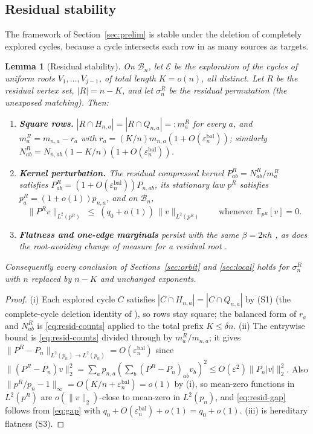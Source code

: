 \documentclass[11pt]{article}
\newcommand{\E}{\mathbb{E}}
\newcommand{\1}{\mathbf{1}}
\newcommand{\eps}{\varepsilon}
\newcommand{\cB}{\mathcal{B}}
\newcommand{\cE}{\mathcal{E}}
\newtheorem{lemma}[theorem]{Lemma}
\theoremstyle{remark}
\begin{document}
\subsection{Residual stability}
The framework of Section~\ref{sec:prelim} is stable under the deletion of
completely explored cycles, because a cycle intersects each row in as many
sources as targets.

\begin{lemma}[Residual stability]\label{lem:residual}
On $\cB_n$, let $\cE$ be the exploration of the cycles of uniform roots
$V_1,\dots,V_{j-1}$, of total length $K=o(n)$, all distinct. Let $R$ be the
residual vertex set, $|R|=n-K$, and let $\sigma_n^R$ be the residual
permutation (the unexposed matching). Then:
\begin{enumerate}[label=(\roman*)]
\item \textbf{Square rows.} $|R\cap H_{n,a}|=|R\cap Q_{n,a}|=:m_a^R$ for
every $a$, and $m_a^R=m_{n,a}-r_a$ with
$r_a=(K/n)m_{n,a}(1+O(\eps_n^{\mathrm{bal}}))$; similarly
$N_{ab}^R=N_{n,ab}(1-K/n)(1+O(\eps_n^{\mathrm{bal}}))$.
\item \textbf{Kernel perturbation.} The residual compressed kernel
$P_{ab}^R=N_{ab}^R/m_a^R$ satisfies
$P_{ab}^R=(1+O(\eps_n^{\mathrm{bal}}))P_{n,ab}$, its stationary law $p^R$
satisfies $p_a^R=(1+o(1))p_{n,a}$, and on $\cB_n$,
\begin{equation}\label{eq:resid-gap}
\|P^Rv\|_{L^2(p^R)}\;\le\;(q_0+o(1))\,\|v\|_{L^2(p^R)}
\qquad\text{whenever }\E_{p^R}[v]=0.
\end{equation}
\item \textbf{Flatness and one-edge marginals} persist with the same
$\beta=2\kappa h$ \cite[Lemmas~6.5, 6.6]{Lon26}, as does the root-avoiding
change of measure for a residual root \cite[Lemma~6.9]{Lon26}.
\end{enumerate}
Consequently every conclusion of Sections~\ref{sec:orbit} and
\ref{sec:local} holds for $\sigma_n^R$ with $n$ replaced by $n-K$ and
unchanged exponents.
\end{lemma}

\begin{proof}
(i) Each explored cycle $C$ satisfies $|C\cap H_{n,a}|=|C\cap Q_{n,a}|$ by
(S1) (the complete-cycle deletion identity of \cite[Section~6.2]{Lon26}),
so rows stay square; the balanced form of $r_a$ and $N_{ab}^R$ is
\eqref{eq:resid-counts} applied to the total prefix $K\le\delta n$.
(ii) The entrywise bound is \eqref{eq:resid-counts} divided through by
$m_a^R/m_{n,a}$; it gives $\|P^R-P_n\|_{L^2(p_n)\to L^2(p_n)}
=O(\eps_n^{\mathrm{bal}})$ since
$\|(P^R-P_n)v\|_2^2=\sum_a p_{n,a}(\sum_b(P^R-P_n)_{ab}v_b)^2
\le O(\eps^2)\|P_n|v|\|_2^2$. Also
$\|p^R/p_n-1\|_\infty=O(K/n+\eps_n^{\mathrm{bal}})=o(1)$ by (i), so
mean-zero functions in $L^2(p^R)$ are $o(\|v\|_2)$-close to mean-zero in
$L^2(p_n)$, and \eqref{eq:resid-gap} follows from \eqref{eq:gap} with
$q_0+O(\eps_n^{\mathrm{bal}})+o(1)=q_0+o(1)$.
(iii) is hereditary flatness (S3).
\end{proof}
\end{document}
